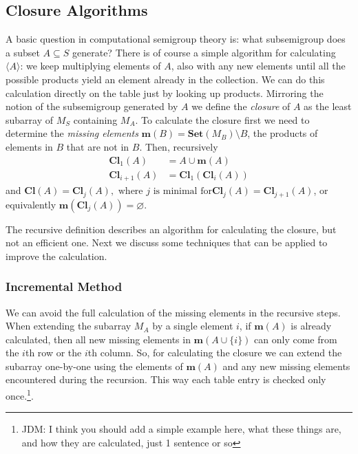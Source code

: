 \documentclass{amsart}
\newcommand{\Set}{\mathbf{Set}}
\newcommand{\Miss}{\mathbf{m}}
\newcommand{\Closure}{\mathbf{Cl}}
\newcommand{\todo}[1]{\textcolor{red}{ \small \textsf{[ #1 ]} \normalsize}}
\theoremstyle{plain}
\theoremstyle{definition}
\begin{document}
\subsection{Closure Algorithms}
A basic question in computational semigroup theory is: what subsemigroup does a subset $A\subseteq S$ generate?
There is of course a simple algorithm for calculating $\langle A\rangle$: we keep multiplying elements of $A$, also with any new elements until all the possible products yield an element already in the collection.
We can do this calculation directly on the table just by looking up products. 
Mirroring the notion of the subsemigroup generated by $A$ we define the
\emph{closure} of $A$ as the least subarray of $M_S$ containing $M_A$. %
To calculate
the closure first we need to determine the \emph{missing elements}
$\Miss(B)=\Set(M_B)\setminus B$, the products of elements in
$B$ that are not in $B$.%
Then, recursively \begin{align*}
\Closure_1(A)&=A\cup\Miss(A)\\ \Closure_{i+1}(A)&=\Closure_1(\Closure_{i}(A))
\end{align*} and $ \Closure(A)=\Closure_j(A), \text{ where $j$ is minimal for
}\Closure_j(A)=\Closure_{j+1}(A)$, or equivalently
$\Miss(\Closure_j(A))=\varnothing$.

The recursive definition describes an algorithm for calculating the closure, but not an efficient one. Next we discuss some techniques that can be applied to improve the calculation.

\subsubsection{Incremental Method}
We can avoid the full calculation of the missing elements in the recursive steps.
When extending the subarray $M_A$ by a single element $i$, if $\Miss(A)$ is already calculated, then all new missing elements in $\Miss(A\cup\{i\})$ can only come from the $i$th row or the $i$th column.
So, for calculating the closure we can extend the subarray one-by-one using the elements of $\Miss(A)$ and any new missing elements encountered during the recursion.
This way each table entry is checked only once.\footnote{JDM: I think you should
  add a simple example here, what these things are, and how they are calculated,
just 1 sentence or so}.
\end{document}
